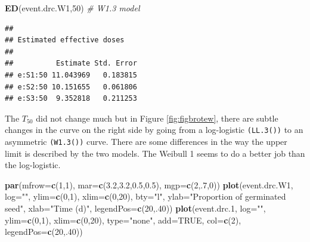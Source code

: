 \documentclass[letterpaper,]{book}
\newenvironment{Shaded}{\begin{snugshade}}{\end{snugshade}}
\newcommand{\CommentTok}[1]{\textcolor[rgb]{0.56,0.35,0.01}{\textit{#1}}}
\newcommand{\DataTypeTok}[1]{\textcolor[rgb]{0.13,0.29,0.53}{#1}}
\newcommand{\DecValTok}[1]{\textcolor[rgb]{0.00,0.00,0.81}{#1}}
\newcommand{\FloatTok}[1]{\textcolor[rgb]{0.00,0.00,0.81}{#1}}
\newcommand{\KeywordTok}[1]{\textcolor[rgb]{0.13,0.29,0.53}{\textbf{#1}}}
\newcommand{\NormalTok}[1]{#1}
\newcommand{\OtherTok}[1]{\textcolor[rgb]{0.56,0.35,0.01}{#1}}
\newcommand{\StringTok}[1]{\textcolor[rgb]{0.31,0.60,0.02}{#1}}
\begin{document}
\begin{Shaded}
\begin{Highlighting}[]
\KeywordTok{ED}\NormalTok{(event.drc.W1,}\DecValTok{50}\NormalTok{) }\CommentTok{# W1.3 model}
\end{Highlighting}
\end{Shaded}

\begin{verbatim}
## 
## Estimated effective doses
## 
##          Estimate Std. Error
## e:S1:50 11.043969   0.183815
## e:S2:50 10.151655   0.061806
## e:S3:50  9.352818   0.211253
\end{verbatim}

The \(T_{50}\) did not change much but in Figure \ref{fig:figbrotew}, there are subtle changes in the curve on the right side by going from a log-logistic \texttt{(LL.3())} to an asymmetric \texttt{(W1.3())} curve. There are some differences in the way the upper limit is described by the two models. The Weibull 1 seems to do a better job than the log-logistic.



\begin{Shaded}
\begin{Highlighting}[]
\KeywordTok{par}\NormalTok{(}\DataTypeTok{mfrow=}\KeywordTok{c}\NormalTok{(}\DecValTok{1}\NormalTok{,}\DecValTok{1}\NormalTok{), }\DataTypeTok{mar=}\KeywordTok{c}\NormalTok{(}\FloatTok{3.2}\NormalTok{,}\FloatTok{3.2}\NormalTok{,}\FloatTok{0.5}\NormalTok{,}\FloatTok{0.5}\NormalTok{), }\DataTypeTok{mgp=}\KeywordTok{c}\NormalTok{(}\DecValTok{2}\NormalTok{,.}\DecValTok{7}\NormalTok{,}\DecValTok{0}\NormalTok{))}
\KeywordTok{plot}\NormalTok{(event.drc.W1, }\DataTypeTok{log=}\StringTok{""}\NormalTok{, }\DataTypeTok{ylim=}\KeywordTok{c}\NormalTok{(}\DecValTok{0}\NormalTok{,}\DecValTok{1}\NormalTok{), }\DataTypeTok{xlim=}\KeywordTok{c}\NormalTok{(}\DecValTok{0}\NormalTok{,}\DecValTok{20}\NormalTok{), }\DataTypeTok{bty=}\StringTok{"l"}\NormalTok{,}
     \DataTypeTok{ylab=}\StringTok{"Proportion of germinated seed"}\NormalTok{, }\DataTypeTok{xlab=}\StringTok{"Time (d)"}\NormalTok{,}
     \DataTypeTok{legendPos=}\KeywordTok{c}\NormalTok{(}\DecValTok{20}\NormalTok{,.}\DecValTok{40}\NormalTok{))}
\KeywordTok{plot}\NormalTok{(event.drc}\FloatTok{.1}\NormalTok{, }\DataTypeTok{log=}\StringTok{""}\NormalTok{, }\DataTypeTok{ylim=}\KeywordTok{c}\NormalTok{(}\DecValTok{0}\NormalTok{,}\DecValTok{1}\NormalTok{), }\DataTypeTok{xlim=}\KeywordTok{c}\NormalTok{(}\DecValTok{0}\NormalTok{,}\DecValTok{20}\NormalTok{),   }
     \DataTypeTok{type=}\StringTok{"none"}\NormalTok{,}
     \DataTypeTok{add=}\OtherTok{TRUE}\NormalTok{, }\DataTypeTok{col=}\KeywordTok{c}\NormalTok{(}\DecValTok{2}\NormalTok{), }\DataTypeTok{legendPos=}\KeywordTok{c}\NormalTok{(}\DecValTok{20}\NormalTok{,.}\DecValTok{40}\NormalTok{))}
\end{Highlighting}
\end{Shaded}
\end{document}
